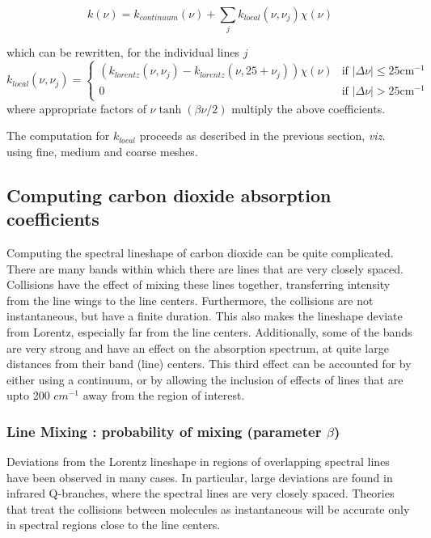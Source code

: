 \documentclass[11pt]{article}
\begin{document}
\[
k(\nu) = k_{continuum}(\nu) + \sum_{j} k_{local}(\nu,\nu_{j}) \chi(\nu)
\]

which can be rewritten, for the individual lines $j$
\[
k_{local}(\nu,\nu_{j}) = 
\left\{
\begin{array}{cl}
     ( k_{lorentz}(\nu,\nu_{j}) - k_{lorentz}(\nu,25+\nu_{j}) ) 
           \chi(\nu)    & \mbox{if $|\Delta\nu| \leq 25 \mbox{cm}^{-1}$} \\
        0               & \mbox{if $|\Delta\nu| > 25 \mbox{cm}^{-1}$}
\end{array}
\right. 
\]
where appropriate factors of $\nu\tanh\left(\beta\nu/2\right)$ 
multiply the above coefficients. 

The computation for $k_{local}$ proceeds as described in the previous 
section, {\em viz.} using fine, medium and coarse meshes.

\subsection{Computing carbon dioxide absorption coefficients}

Computing the spectral lineshape of carbon dioxide can be quite complicated.
There are many bands within which there are lines that are very closely 
spaced. Collisions have the effect of mixing these lines together,
transferring intensity from the line wings to the line centers. Furthermore,
the  collisions are not instantaneous, but have a finite duration. This 
also makes the lineshape deviate from Lorentz, especially far from the line
centers. Additionally, some of the bands are very strong and have an 
effect on the absorption spectrum, at
quite large distances from their band (line) centers. This third effect can
be accounted for by either using a continuum, or by allowing the inclusion
of effects of lines that are upto 200 $cm^{-1}$ away from the region of 
interest.

\subsubsection{Line Mixing : probability of mixing (parameter $\beta$)}

Deviations from the Lorentz lineshape in regions of overlapping spectral
lines have been observed in many cases. In particular, large deviations are
found in infrared Q-branches, where the spectral lines are very closely 
spaced.  Theories that treat the collisions between molecules as 
instantaneous will be accurate only in spectral regions close to the 
line centers.  
\end{document}

